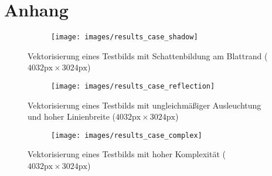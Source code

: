 \printbibliography[heading=bibnumbered]
\listoffigures{}

\chapter{Anhang}

\begin{figure}[htbp]
    \begin{subfigure}[t]{0.45\textwidth}
        \texttt{[image: images/results\_case\_shadow]}
    \end{subfigure}
    \hfill
    \begin{subfigure}[t]{0.45\textwidth}
        
    \end{subfigure}
    \caption{Vektorisierung eines Testbilds mit Schattenbildung am Blattrand (\(4032\text{px}\times3024\text{px}\))}%
    \label{fig:results_case_shadow}
\end{figure}

\begin{figure}[htbp]
    \begin{subfigure}[t]{0.45\textwidth}
        \texttt{[image: images/results\_case\_reflection]}
    \end{subfigure}
    \hfill
    \begin{subfigure}[t]{0.45\textwidth}
        
    \end{subfigure}
    \caption{Vektorisierung eines Testbilds mit ungleichmäßiger Ausleuchtung und hoher Linienbreite (\(4032\text{px}\times3024\text{px}\))}%
    \label{fig:results_case_reflection}
\end{figure}

\begin{figure}[htbp]
    \centering
    \begin{subfigure}[t]{0.8\textwidth}
        \texttt{[image: images/results\_case\_complex]}
    \end{subfigure}

    \begin{subfigure}[t]{0.8\textwidth}
        
    \end{subfigure}
    \caption{Vektorisierung eines Testbilds mit hoher Komplexität (\(4032\text{px}\times3024\text{px}\))}%
    \label{fig:results_case_complex}
\end{figure}

